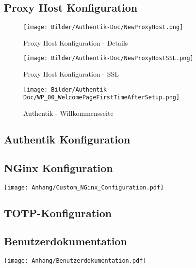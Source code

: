 \subsection{Proxy Host Konfiguration}
\label{app:ProxyHostConfig}
\begin{figure}[ht]
    \centering
    \texttt{[image: Bilder/Authentik-Doc/NewProxyHost.png]}
    \caption{Proxy Host Konfiguration - Details}
  \end{figure}
  
  \vspace{0.75cm} %
  
  \begin{figure}[ht]
    \centering
    \texttt{[image: Bilder/Authentik-Doc/NewProxyHostSSL.png]}
    \caption{Proxy Host Konfiguration - SSL}
  \end{figure}
  
  \vspace{0.75cm} %
  
  \begin{figure}[ht]
    \centering
    \texttt{[image: Bilder/Authentik-Doc/WP\_00\_WelcomePageFirstTimeAfterSetup.png]}
    \caption{Authentik - Willkommensseite}
  \end{figure}

\subsection{Authentik Konfiguration}
\label{app:AuthentikConfig}

\subsection{NGinx Konfiguration}
\label{app:CustomNGinxConfig}
\texttt{[image: Anhang/Custom\_NGinx\_Configuration.pdf]}

\subsection{TOTP-Konfiguration}
\label{sec:TOTPConfig}

\subsection{Benutzerdokumentation}
\label{app:Benutzerdokumentation}
\texttt{[image: Anhang/Benutzerdokumentation.pdf]}
